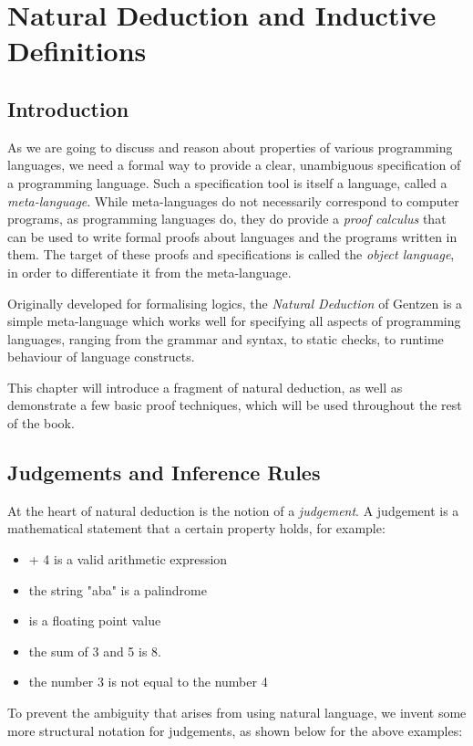 \documentclass{book}
\begin{document}
\chapter{Natural Deduction and Inductive Definitions}
\section{Introduction}

As we are going to discuss and reason about properties of various programming
languages, we need a formal way to provide a clear, unambiguous specification of
a programming language. Such a specification tool is itself a language, called a
\emph{meta-language}. While meta-languages do not necessarily correspond to
computer programs, as programming languages do, they do provide a \emph{proof
  calculus} that can be used to write formal proofs about languages and the
programs written in them. The target of these proofs and specifications is
called the \emph{object language}, in order to differentiate it from the
meta-language.

Originally developed for formalising
logics, the \emph{Natural Deduction} of Gentzen is a simple
meta-language which works well for specifying all aspects of programming
languages, ranging from the grammar and syntax, to static checks, to runtime
behaviour of language constructs.

This chapter will introduce a fragment of natural deduction, as well as
demonstrate a few basic proof techniques, which will be used throughout
the rest of the book. 

\section{Judgements and Inference Rules}

At the heart of natural deduction is the notion of a \emph{judgement}. A
judgement is a mathematical statement that a certain property holds, for
example:

\begin{itemize}
\item {} + 4 \> is a valid arithmetic expression
\item the string \<"aba"\> is a palindrome
\item {}\> is a floating point value
\item the sum of 3 and 5 is 8.
\item the number 3 is not equal to the number 4
\end{itemize}
To prevent the ambiguity that arises from using natural language, we invent some
more structural notation for judgements, as shown below for the above examples:
\end{document}
